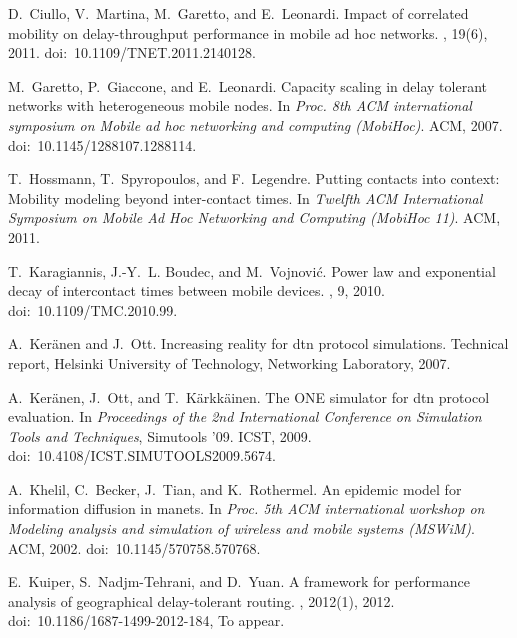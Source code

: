 \documentclass{article}
\begin{document}
\begin{thebibliography}{10}
D.~Ciullo, V.~Martina, M.~Garetto, and E.~Leonardi.
\newblock Impact of correlated mobility on delay-throughput performance in
  mobile ad hoc networks.
, 19(6), 2011.
\newblock doi:~10.1109/TNET.2011.2140128.

M.~Garetto, P.~Giaccone, and E.~Leonardi.
\newblock Capacity scaling in delay tolerant networks with heterogeneous mobile
  nodes.
\newblock In {\em Proc. 8th ACM international symposium on Mobile ad hoc
  networking and computing (MobiHoc)}. ACM, 2007.
\newblock doi:~10.1145/1288107.1288114.

T.~Hossmann, T.~Spyropoulos, and F.~Legendre.
\newblock Putting contacts into context: Mobility modeling beyond inter-contact
  times.
\newblock In {\em Twelfth ACM International Symposium on Mobile Ad Hoc
  Networking and Computing (MobiHoc 11)}. ACM, 2011.

T.~Karagiannis, J.-Y.~L. Boudec, and M.~Vojnovi{\'c}.
\newblock Power law and exponential decay of intercontact times between mobile
  devices.
, 9, 2010.
\newblock doi:~10.1109/TMC.2010.99.

A.~Ker{\"a}nen and J.~Ott.
\newblock Increasing reality for dtn protocol simulations.
\newblock Technical report, Helsinki University of Technology, Networking
  Laboratory, 2007.

A.~Ker\"{a}nen, J.~Ott, and T.~K\"{a}rkk\"{a}inen.
\newblock The {ONE} simulator for dtn protocol evaluation.
\newblock In {\em Proceedings of the 2nd International Conference on Simulation
  Tools and Techniques}, Simutools '09. ICST, 2009.
\newblock doi:~10.4108/ICST.SIMUTOOLS2009.5674.

A.~Khelil, C.~Becker, J.~Tian, and K.~Rothermel.
\newblock An epidemic model for information diffusion in manets.
\newblock In {\em Proc. 5th ACM international workshop on Modeling analysis and
  simulation of wireless and mobile systems (MSWiM)}. ACM, 2002.
\newblock doi:~10.1145/570758.570768.

E.~Kuiper, S.~Nadjm-Tehrani, and D.~Yuan.
\newblock A framework for performance analysis of geographical delay-tolerant
  routing.
,
  2012(1), 2012.
\newblock doi:~10.1186/1687-1499-2012-184, To appear.


\end{thebibliography}
\end{document}

